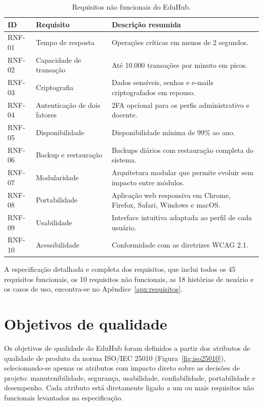 \begin{table}[ht]
\centering
\caption{Requisitos não funcionais do EduHub.}
\label{tab:rnf-resumo}
\begin{tabularx}{\textwidth}{p{} p{} X}
\toprule
\textbf{ID} & \textbf{Requisito} & \textbf{Descrição resumida} \\
\midrule
RNF-01 & Tempo de resposta & Operações críticas em menos de 2 segundos. \\
RNF-02 & Capacidade de transação & Até 10.000 transações por minuto em picos. \\
RNF-03 & Criptografia & Dados sensíveis, senhas e e-mails criptografados em repouso. \\
RNF-04 & Autenticação de dois fatores & 2FA opcional para os perfis administrativo e docente. \\
RNF-05 & Disponibilidade & Disponibilidade mínima de 99\% ao ano. \\
RNF-06 & Backup e restauração & Backups diários com restauração completa do sistema. \\
RNF-07 & Modularidade & Arquitetura modular que permite evoluir sem impacto entre módulos. \\
RNF-08 & Portabilidade & Aplicação web responsiva em Chrome, Firefox, Safari, Windows e macOS. \\
RNF-09 & Usabilidade & Interface intuitiva adaptada ao perfil de cada usuário. \\
RNF-10 & Acessibilidade & Conformidade com as diretrizes WCAG 2.1. \\
\bottomrule
\end{tabularx}
\end{table}

A especificação detalhada e completa dos requisitos, que inclui todos os
45 requisitos funcionais, os 10 requisitos não funcionais, as 18 histórias
de usuário e os casos de uso, encontra-se no Apêndice~\ref{apx:requisitos}.

\section{Objetivos de qualidade}\label{sec:quality-goals}

Os objetivos de qualidade do EduHub foram definidos a partir dos atributos
de qualidade de produto da norma ISO/IEC 25010 (Figura~\ref{fig:iso25010}),
selecionando-se apenas os atributos com impacto direto sobre as decisões de
projeto: manutenibilidade, segurança, usabilidade, confiabilidade,
portabilidade e desempenho. Cada atributo está diretamente ligado a um ou
mais requisitos não funcionais levantados na especificação.


